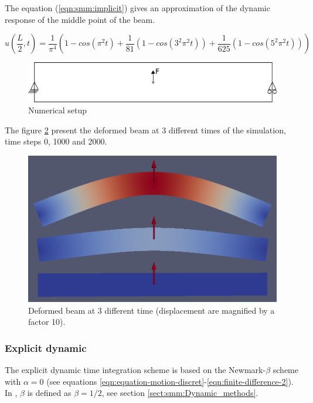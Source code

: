 \documentclass[a4paper,11pt]{book}
\newcommand{\akantu}{{\cminfamily{\textbf{Akantu}}}\xspace}
\begin{document}
The  equation (\ref{eqn:smm:implicit})  gives  an approximation  of the  dynamic
response of the middle point of the beam.

\begin{equation}\label{eqn:smm:implicit}
  u(\frac{L}{2}, t) = \frac{1}{\pi^4} (1 - cos(\pi^2 t) +
  \frac{1}{81}(1 - cos(3^2 \pi^2 t)) +
  \frac{1}{625}(1 - cos(5^2 \pi^2 t)))
\end{equation}

\begin{figure}[!htb]
  \centering
  \includegraphics[scale=.6]{figures/implicit_dynamic}
  \caption{Numerical setup}
  \label{fig:smm:implicit:dynamic}
\end{figure}

The figure \ref{fig:smm:implicit:dynamic_solution}  present the deformed beam at
3 different times of the simulation, time steps 0, 1000 and 2000.

\begin{figure}[!htb]
  \centering
  \includegraphics[width=.6\linewidth]{figures/dynamic_analysis}
  \caption{Deformed beam at 3 different time (displacement are
    magnified by a factor 10).}
  \label{fig:smm:implicit:dynamic_solution}
\end{figure}

\subsubsection{Explicit dynamic}

The explicit  dynamic time  integration scheme is  based on  the Newmark-$\beta$
scheme            with            $\alpha=0$           (see            equations
\ref{eqn:equation-motion-discret}-\ref{eqn:finite-difference-2}).   In  \akantu,
$\beta$ is defined as $\beta=1/2$, see section \ref{sect:smm:Dynamic_methods}.
\end{document}
